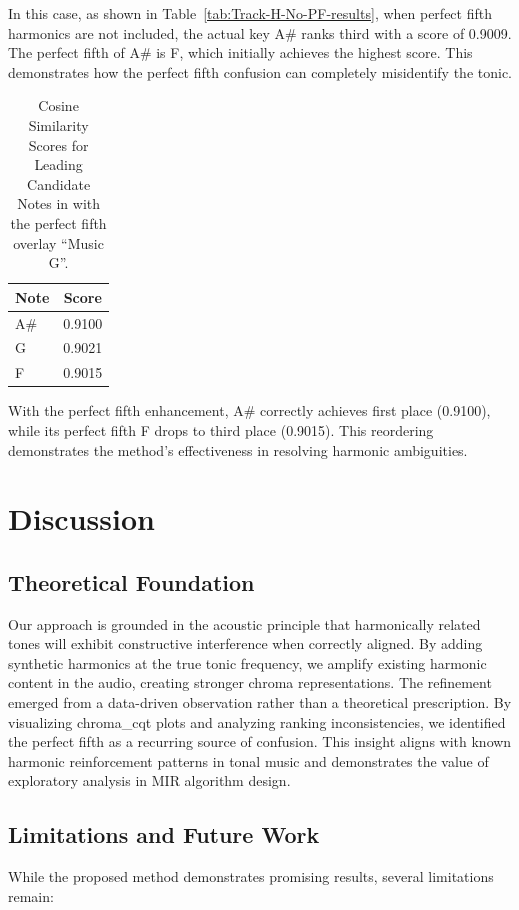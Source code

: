 \documentclass[10pt,twocolumn]{article}
\begin{document}
In this case, as shown in Table~\ref{tab:Track-H-No-PF-results}, when perfect fifth harmonics are not included, the actual key A\# ranks third with a score of 0.9009.
The perfect fifth of A\# is F, which initially achieves the highest score.
This demonstrates how the perfect fifth confusion can completely misidentify the tonic.

\begin{table}[H]
\centering
\begin{tabular}{@{}lc@{}}
\toprule
\textbf{Note} & \textbf{Score} \\
\midrule
A\# & 0.9100 \\
G & 0.9021 \\
F & 0.9015 \\
\bottomrule
\end{tabular}
\caption{Cosine Similarity Scores for Leading Candidate Notes in with the perfect fifth overlay ``Music G''.}
\label{tab:Track-H-PF-results}
\end{table}


With the perfect fifth enhancement, A\# correctly achieves first place (0.9100), while its perfect fifth F drops to third place (0.9015).
This reordering demonstrates the method's effectiveness in resolving harmonic ambiguities.

\section{Discussion}\label{sec:discussion}

\subsection{Theoretical Foundation}\label{subsec:theoretical-foundation}
Our approach is grounded in the acoustic principle that harmonically related tones will exhibit constructive interference when correctly aligned.
By adding synthetic harmonics at the true tonic frequency, we amplify existing harmonic content in the audio, creating stronger chroma representations.
The refinement emerged from a data-driven observation rather than a theoretical prescription.
By visualizing chroma\_cqt plots and analyzing ranking inconsistencies, we identified the perfect fifth as a recurring source of confusion.
This insight aligns with known harmonic reinforcement patterns in tonal music and demonstrates the value of exploratory analysis in MIR algorithm design.

\subsection{Limitations and Future Work}\label{subsec:limitations-and-future-work}
While the proposed method demonstrates promising results, several limitations remain:
\end{document}
